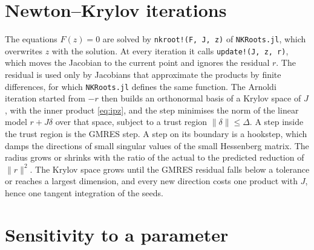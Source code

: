 \documentclass[11pt,a4paper]{article}
\newcommand{\code}[1]{\texttt{#1}}
\begin{document}
\section{Newton--Krylov iterations}
\label{sec:newton}

The equations $F(z) = 0$ are solved by \code{nkroot!(F, J, z)} of \code{NKRoots.jl}, which
overwrites $z$ with the solution. At every iteration it calls \code{update!(J, z, r)}, which moves
the Jacobian to the current point and ignores the residual $r$. The residual is used only by
Jacobians that approximate the products by finite differences, for which \code{NKRoots.jl} defines
the same function. The Arnoldi iteration started from $-r$ then builds an orthonormal basis of a
Krylov space of $J$, with the inner product \eqref{eq:ipz}, and the step minimises the norm of the
linear model $r + J\delta$ over that space, subject to a trust region $\|\delta\| \leq \Delta$. A
step inside the trust region is the GMRES step. A step on its boundary is a hookstep, which
damps the directions of small singular values of the small Hessenberg matrix. The radius grows or
shrinks with the ratio of the actual to the predicted reduction of $\|r\|^2$. The Krylov space
grows until the GMRES residual falls below a tolerance or reaches a largest dimension, and every
new direction costs one product with $J$, hence one tangent integration of the seeds.

\section{Sensitivity to a parameter}
\label{sec:sensitivity}
\end{document}
